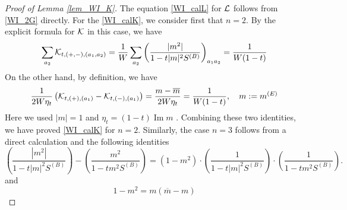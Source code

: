 \documentclass[10pt,reqno]{article}
\DeclareMathOperator{\im}{{\mathrm{Im}}}
\renewcommand{\bar}{\overline}
\theoremstyle{plain} %
\theoremstyle{remark}
\numberwithin{equation}{section}
\begin{document}
 \begin{proof}[Proof of Lemma \ref{lem_WI_K}]
 The equation \eqref{WI_calL} for  $\cal L$ follows from \eqref{WI_2G} directly.  For the \eqref{WI_calK}, we consider first that  $n=2$. 
By the explicit formula for $\cal K$ in this case, we have 
 \begin{align}\label{hsgw2}
 \sum_{a_2} {\cal K}_{t, (+,-), (a_1,a_2)}
 =\frac1W \sum_{a_2}
\left(\frac{|m^2|}{1-t|m|^2S^{(B)}}\right)_{a_1a_2}
=\frac{1}{W(1-t)}    
 \end{align}
 On the other hand, by definition, we have 
 $$
 \frac{1}{2W\eta_t}\left({\cal K}_{t, (+ ), ( a_1)}-{\cal K}_{t, (- ), ( a_1)}\right)=\frac{m-\bar m}{2W\eta_t}=\frac{1}{W(1-t)}, \quad m:= m^{(E)}
 $$
 Here we used $|m|=1$ and $\eta_t=(1-t)\im m$ .  Combining  these two identities, we have proved   \eqref{WI_calK} for $n=2$. 
 Similarly, the case $n=3$ follows from a direct calculation and  the following identities 
 $$
 \left(\frac{|m^2|}{1-t|m|^2S^{(B)}}\right)-\left(\frac{m^2}{1-tm^2S^{(B)}}\right)=
 \left(1-m^2\right)\cdot\left(\frac{1}{1-t|m|^2S^{(B)}}\right)\cdot \left(\frac{1}{1-tm^2S^{(B)}}\right).
 $$
 and
 $$
 1-m^2=m(\bar m-m)
 $$
 

\end{proof}
\end{document}
